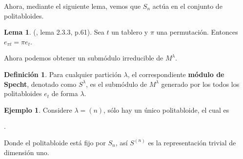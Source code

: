 \documentclass[12pt]{book}
\theoremstyle{definition}
\newtheorem{definition}[theorem]{Definición}
\newtheorem{example}[theorem]{Ejemplo}
\newtheorem{lemma}[theorem]{Lema}
\newcounter{in}
\newcounter{ini}
\begin{document}
Ahora, mediante el siguiente lema, vemos que $S_{n}$ actúa en el
conjunto de politabloides.
\begin{lemma}{(\cite{sagan2001symmetric}, lema 2.3.3, p.61)}.
  \label{lema}
  Sea $t$ un tablero y $\pi$ una permutación. Entonces $e_{\pi t}=\pi e_{t}$.
\end{lemma}
Ahora podemos obtener un submódulo irreducible de
$M^{\lambda}$.
\begin{definition}
  Para cualquier partición $\lambda$, el correspondiente
  \textbf{módulo de Specht}, denotado como $S^{\lambda}$, es el submódulo
  de $M^{\lambda}$ generado por los todos los politabloides $e_{t}$ de
  forma $\lambda$.
\end{definition}
\begin{example}
  \label{n}
  Considere $\lambda=(n)$, sólo hay un único politabloide, el cual es
  \begin{center}
     \quad .
  \end{center}
Donde el politabloide está fijo por $S_{n}$, así $S^{(n)}$ es la
representación trivial de dimensión uno. 
\end{example}
\end{document}
